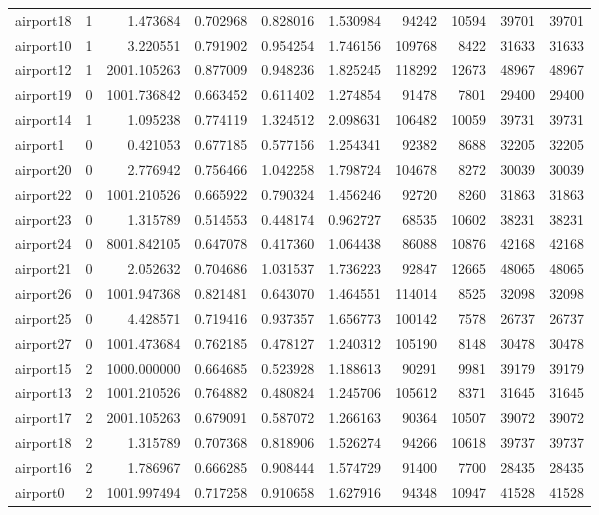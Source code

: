 \begin{longtable}{|l|r|r|r|r|r|r|r|r|r|}
airport18 & 1 & 1.473684 & 0.702968 & 0.828016 & 1.530984 & 94242 & 10594 & 39701 & 39701 \\
airport10 & 1 & 3.220551 & 0.791902 & 0.954254 & 1.746156 & 109768 & 8422 & 31633 & 31633 \\
airport12 & 1 & 2001.105263 & 0.877009 & 0.948236 & 1.825245 & 118292 & 12673 & 48967 & 48967 \\
airport19 & 0 & 1001.736842 & 0.663452 & 0.611402 & 1.274854 & 91478 & 7801 & 29400 & 29400 \\
airport14 & 1 & 1.095238 & 0.774119 & 1.324512 & 2.098631 & 106482 & 10059 & 39731 & 39731 \\
airport1 & 0 & 0.421053 & 0.677185 & 0.577156 & 1.254341 & 92382 & 8688 & 32205 & 32205 \\
airport20 & 0 & 2.776942 & 0.756466 & 1.042258 & 1.798724 & 104678 & 8272 & 30039 & 30039 \\
airport22 & 0 & 1001.210526 & 0.665922 & 0.790324 & 1.456246 & 92720 & 8260 & 31863 & 31863 \\
airport23 & 0 & 1.315789 & 0.514553 & 0.448174 & 0.962727 & 68535 & 10602 & 38231 & 38231 \\
airport24 & 0 & 8001.842105 & 0.647078 & 0.417360 & 1.064438 & 86088 & 10876 & 42168 & 42168 \\
airport21 & 0 & 2.052632 & 0.704686 & 1.031537 & 1.736223 & 92847 & 12665 & 48065 & 48065 \\
airport26 & 0 & 1001.947368 & 0.821481 & 0.643070 & 1.464551 & 114014 & 8525 & 32098 & 32098 \\
airport25 & 0 & 4.428571 & 0.719416 & 0.937357 & 1.656773 & 100142 & 7578 & 26737 & 26737 \\
airport27 & 0 & 1001.473684 & 0.762185 & 0.478127 & 1.240312 & 105190 & 8148 & 30478 & 30478 \\
airport15 & 2 & 1000.000000 & 0.664685 & 0.523928 & 1.188613 & 90291 & 9981 & 39179 & 39179 \\
airport13 & 2 & 1001.210526 & 0.764882 & 0.480824 & 1.245706 & 105612 & 8371 & 31645 & 31645 \\
airport17 & 2 & 2001.105263 & 0.679091 & 0.587072 & 1.266163 & 90364 & 10507 & 39072 & 39072 \\
airport18 & 2 & 1.315789 & 0.707368 & 0.818906 & 1.526274 & 94266 & 10618 & 39737 & 39737 \\
airport16 & 2 & 1.786967 & 0.666285 & 0.908444 & 1.574729 & 91400 & 7700 & 28435 & 28435 \\
airport0 & 2 & 1001.997494 & 0.717258 & 0.910658 & 1.627916 & 94348 & 10947 & 41528 & 41528 \\

\end{longtable}

